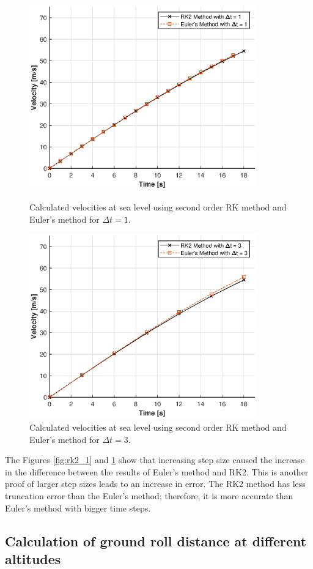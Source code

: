 \documentclass[letterpaper,12pt]{article}
\begin{document}
\begin{figure}[!h]
        \centering
        \includegraphics[max height=8cm]{graphs/compare1.eps}
        \caption{Calculated velocities at sea level using second order RK method and Euler's method for $\Delta t=1$.}
        \label{fig:rk2_1}

        \includegraphics[max height=8cm]{graphs/compare3.eps}
        \caption{Calculated velocities at sea level using second order RK method and Euler's method for $\Delta t=3$.}
        \label{fig:rk2_3}
\end{figure}
The Figures \ref{fig:rk2_1} and \ref{fig:rk2_3} show that increasing step size caused the increase in the 
difference between the results of Euler's method and RK2. This is another proof of larger step sizes leads to an increase in error.
The RK2 method has less truncation error than the Euler's method; therefore, it is more accurate than Euler's method with bigger 
time steps.  

\newpage
\subsection{Calculation of ground roll distance at different altitudes}
\end{document}
